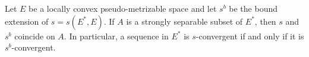 Let $E$ be a locally convex pseudo-metrizable space and let $s^{b}$ be the bound extension of $s = s(E^{*}, E)$. If $A$ is a strongly separable subset of $E^{*}$, then $s$ and $s^{b}$ coincide on $A$. In particular, a sequence in $E^{*}$ is $s$-convergent if and only if it is $s^{b}$-convergent.
